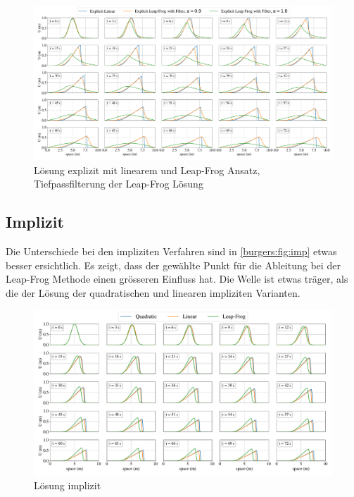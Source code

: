 	  \begin{figure}
		\centering
		\includegraphics[width=1\textwidth]{papers/burgers/BurgersEquation/time_filter.pdf}
		\caption{L\"osung explizit mit linearem und Leap-Frog Ansatz, Tiefpassfilterung der Leap-Frog L\"osung }
		\label{burgers:fig:time}
		\end{figure}


	\subsection{Implizit}

	Die Unterschiede bei den impliziten Verfahren sind in \autoref{burgers:fig:imp} etwas besser ersichtlich.
	Es zeigt, dass der gew\"ahlte Punkt f\"ur die Ableitung bei der Leap-Frog Methode einen gr\"osseren Einfluss hat.
	Die Welle ist etwas tr\"ager, als die der L\"osung der quadratischen und linearen impliziten Varianten.

    \begin{figure}
	\centering
	\includegraphics[width=1\textwidth]{papers/burgers/BurgersEquation/imp_paper.pdf}
	\caption{L\"osung implizit}
	\label{burgers:fig:imp}
	\end{figure}

\newpage %
